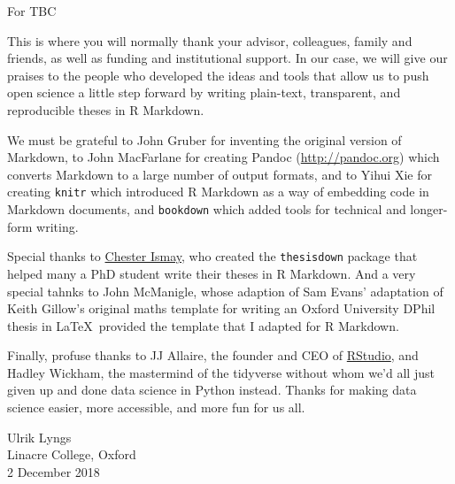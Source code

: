 \documentclass[a4paper, nobind]{templates/ociamthesis}
\begin{document}
\begin{romanpages}

\maketitle

\begin{dedication}
  For TBC
\end{dedication}

\begin{acknowledgements}
 	This is where you will normally thank your advisor, colleagues, family and friends, as well as funding and institutional support. In our case, we will give our praises to the people who developed the ideas and tools that allow us to push open science a little step forward by writing plain-text, transparent, and reproducible theses in R Markdown.

We must be grateful to John Gruber for inventing the original version of Markdown, to John MacFarlane for creating Pandoc (\url{http://pandoc.org}) which converts Markdown to a large number of output formats, and to Yihui Xie for creating \texttt{knitr} which introduced R Markdown as a way of embedding code in Markdown documents, and \texttt{bookdown} which added tools for technical and longer-form writing.

Special thanks to \href{http://chester.rbind.io}{Chester Ismay}, who created the \texttt{thesisdown} package that helped many a PhD student write their theses in R Markdown. And a very special tahnks to John McManigle, whose adaption of Sam Evans' adaptation of Keith Gillow's original maths template for writing an Oxford University DPhil thesis in \LaTeX~provided the template that I adapted for R Markdown.

Finally, profuse thanks to JJ Allaire, the founder and CEO of \href{http://rstudio.com}{RStudio}, and Hadley Wickham, the mastermind of the tidyverse without whom we'd all just given up and done data science in Python instead. Thanks for making data science easier, more accessible, and more fun for us all.

\begin{flushright}
Ulrik Lyngs \\
Linacre College, Oxford \\
2 December 2018
\end{flushright}
\end{acknowledgements}



\end{romanpages}
\end{document}
